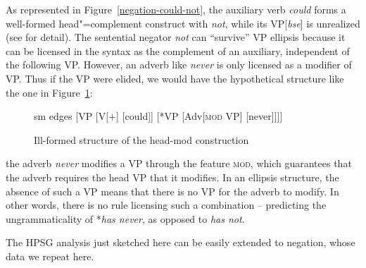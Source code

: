 \documentclass[output=paper
	        ,collection
	        ,collectionchapter
 	        ,biblatex
                ,babelshorthands
                ,newtxmath
                ,draftmode
                ,colorlinks, citecolor=brown
]{langscibook}
\begin{document}
\begin{exe}
\begin{xlist}
\begin{exe}
\begin{xlist}
As represented in Figure~\ref{negation-could-not}, the auxiliary verb \textit{could} forms a well-formed head"=complement construct with \textit{not}, while its
VP[\textit{bse}] is unrealized (see \citealt{Kim:00, KS:08} for
detail). The sentential negator \textit{not} can ``survive'' VP ellipsis because it can be
licensed in the syntax as the complement of an auxiliary, independent
of the following VP.  However, an adverb like \textit{never} is only
licensed as a modifier of VP. Thus if the VP were elided, we would have the hypothetical
structure like the one in Figure~\ref{negation-fig-could-never}:
\begin{figure}
	\begin{forest}
		sm edges
		[VP
			[V{[\aux $+$]}
				[could]]
			[*VP
				[Adv{[\textsc{mod} VP]}
					[never]]]]
	\end{forest}
\caption{Ill-formed structure of the head-mod construction}\label{negation-fig-could-never}
\end{figure}
the adverb \textit{never} modifies a VP through the feature \textsc{mod},
which guarantees that the adverb requires the head VP that it
modifies. In an ellipsis structure, the absence of such a VP means
that there is no VP for the adverb to modify.  In other words, there
is no rule licensing such a combination -- predicting the
ungrammaticality of *\textit{has never},  as opposed to \textit{has not}.


The HPSG analysis just sketched here can be easily extended to  negation, whose
data we repeat here.

\eal
{}
\zl


\end{xlist}
\end{exe}
\end{xlist}
\end{exe}
\end{document}
